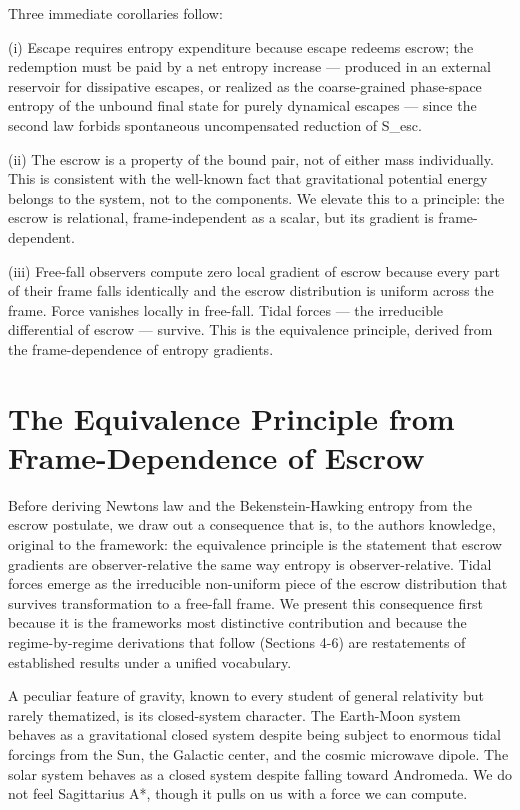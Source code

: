 \documentclass[11pt]{article}
\begin{document}
Three immediate corollaries follow:

(i) Escape requires entropy expenditure because escape redeems escrow; the redemption must be paid by a net entropy increase --- produced in an external reservoir for dissipative escapes, or realized as the coarse-grained phase-space entropy of the unbound final state for purely dynamical escapes --- since the second law forbids spontaneous uncompensated reduction of S\_esc.

(ii) The escrow is a property of the bound pair, not of either mass individually. This is consistent with the well-known fact that gravitational potential energy belongs to the system, not to the components. We elevate this to a principle: the escrow is relational, frame-independent as a scalar, but its gradient is frame-dependent.

(iii) Free-fall observers compute zero local gradient of escrow because every part of their frame falls identically and the escrow distribution is uniform across the frame. Force vanishes locally in free-fall. Tidal forces --- the irreducible differential of escrow --- survive. This is the equivalence principle, derived from the frame-dependence of entropy gradients.

\section{The Equivalence Principle from Frame-Dependence of Escrow}\label{the-equivalence-principle-from-frame-dependence-of-escrow}

Before deriving Newton\textquotesingle s law and the Bekenstein-Hawking entropy from the escrow postulate, we draw out a consequence that is, to the author\textquotesingle s knowledge, original to the framework: the equivalence principle is the statement that escrow gradients are observer-relative the same way entropy is observer-relative. Tidal forces emerge as the irreducible non-uniform piece of the escrow distribution that survives transformation to a free-fall frame. We present this consequence first because it is the framework\textquotesingle s most distinctive contribution and because the regime-by-regime derivations that follow (Sections 4-6) are restatements of established results under a unified vocabulary.

A peculiar feature of gravity, known to every student of general relativity but rarely thematized, is its closed-system character. The Earth-Moon system behaves as a gravitational closed system despite being subject to enormous tidal forcings from the Sun, the Galactic center, and the cosmic microwave dipole. The solar system behaves as a closed system despite falling toward Andromeda. We do not feel Sagittarius A*, though it pulls on us with a force we can compute.
\end{document}
